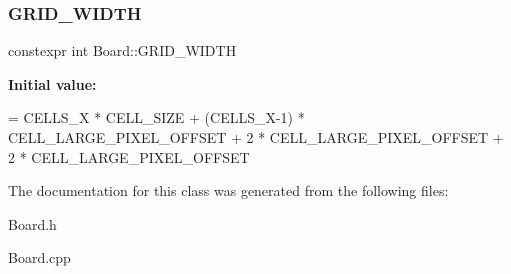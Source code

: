\subsubsection{\texorpdfstring{G\+R\+I\+D\+\_\+\+W\+I\+D\+TH}{GRID\_WIDTH}}
{\footnotesize\ttfamily constexpr int Board\+::\+G\+R\+I\+D\+\_\+\+W\+I\+D\+TH\hspace{0.3cm}{\ttfamily [static]}}

{\bfseries Initial value\+:}
\begin{DoxyCode}
= CELLS\_X * CELL\_SIZE + (CELLS\_X-1) * CELL\_LARGE\_PIXEL\_OFFSET + 2 * CELL\_LARGE\_PIXEL\_OFFSET
                                      + 2 * CELL\_LARGE\_PIXEL\_OFFSET
\end{DoxyCode}


The documentation for this class was generated from the following files\+:\begin{DoxyCompactItemize}
\item 
Board.\+h\item 
Board.\+cpp\end{DoxyCompactItemize}
